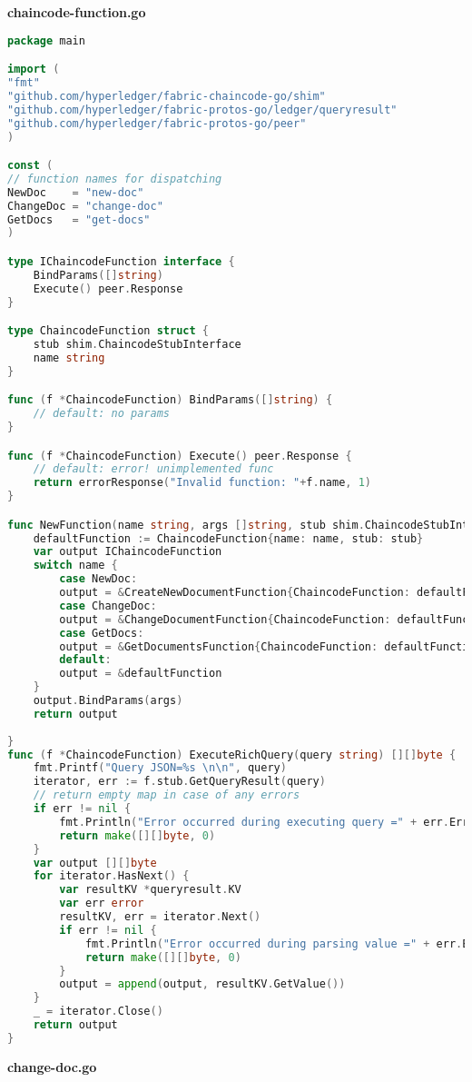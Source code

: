 \textbf{chaincode-function.go}
\begin{lstlisting}[language=Go]
package main

import (
"fmt"
"github.com/hyperledger/fabric-chaincode-go/shim"
"github.com/hyperledger/fabric-protos-go/ledger/queryresult"
"github.com/hyperledger/fabric-protos-go/peer"
)

const (
// function names for dispatching
NewDoc    = "new-doc"
ChangeDoc = "change-doc"
GetDocs   = "get-docs"
)

type IChaincodeFunction interface {
	BindParams([]string)
	Execute() peer.Response
}

type ChaincodeFunction struct {
	stub shim.ChaincodeStubInterface
	name string
}

func (f *ChaincodeFunction) BindParams([]string) {
	// default: no params
}

func (f *ChaincodeFunction) Execute() peer.Response {
	// default: error! unimplemented func
	return errorResponse("Invalid function: "+f.name, 1)
}

func NewFunction(name string, args []string, stub shim.ChaincodeStubInterface) IChaincodeFunction {
	defaultFunction := ChaincodeFunction{name: name, stub: stub}
	var output IChaincodeFunction
	switch name {
		case NewDoc:
		output = &CreateNewDocumentFunction{ChaincodeFunction: defaultFunction}
		case ChangeDoc:
		output = &ChangeDocumentFunction{ChaincodeFunction: defaultFunction}
		case GetDocs:
		output = &GetDocumentsFunction{ChaincodeFunction: defaultFunction}
		default:
		output = &defaultFunction
	}
	output.BindParams(args)
	return output
	
}
func (f *ChaincodeFunction) ExecuteRichQuery(query string) [][]byte {
	fmt.Printf("Query JSON=%s \n\n", query)
	iterator, err := f.stub.GetQueryResult(query)
	// return empty map in case of any errors
	if err != nil {
		fmt.Println("Error occurred during executing query =" + err.Error())
		return make([][]byte, 0)
	}
	var output [][]byte
	for iterator.HasNext() {
		var resultKV *queryresult.KV
		var err error
		resultKV, err = iterator.Next()
		if err != nil {
			fmt.Println("Error occurred during parsing value =" + err.Error())
			return make([][]byte, 0)
		}
		output = append(output, resultKV.GetValue())
	}
	_ = iterator.Close()
	return output
}

\end{lstlisting}
\textbf{change-doc.go}

